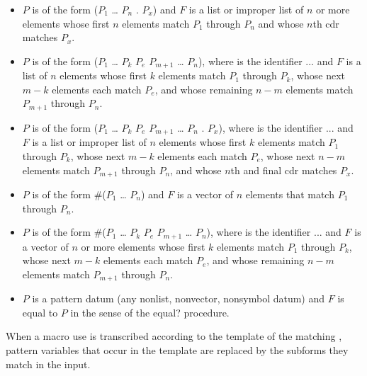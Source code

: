 \begin{entry}{%
}
\begin{itemize}
\item $P$ is of the form
{\cf ($P_1$ \dots{} $P_n$ . $P_x$)}
and $F$ is a list or improper list of $n$ or more elements
whose first $n$ elements match $P_1$ through $P_n$
and
whose $n$th cdr matches $P_x$.

\item $P$ is of the form
{\cf ($P_1$ \dots{} $P_k$ $P_e$  $P_{m+1}$ \dots{} $P_n$)},
where  is the identifier {\cf ...}
and $F$ is a list of $n$
elements whose first $k$ elements match $P_1$ through $P_k$,
whose next $m-k$ elements each match $P_e$,
and
whose remaining $n-m$ elements match $P_{m+1}$ through $P_n$.

\item $P$ is of the form
{\cf ($P_1$ \dots{} $P_k$ $P_e$  $P_{m+1}$ \dots{} $P_n$ . $P_x$)},
where  is the identifier {\cf ...}
and $F$ is a list or improper list of $n$
elements whose first $k$ elements match $P_1$ through $P_k$,
whose next $m-k$ elements each match $P_e$,
whose next $n-m$ elements match $P_{m+1}$ through $P_n$,
and 
whose $n$th and final cdr matches $P_x$.

\item $P$ is of the form
{\cf \#($P_1$ \dots{} $P_n$)}
and $F$ is a vector of $n$ elements that match $P_1$ through
$P_n$.

\item $P$ is of the form
{\cf \#($P_1$ \dots{} $P_k$ $P_e$  $P_{m+1}$ \dots{} $P_n$)},
where  is the identifier {\cf ...}
and $F$ is a vector of $n$ or more elements
whose first $k$ elements match $P_1$ through $P_k$,
whose next $m-k$ elements each match $P_e$,
and
whose remaining $n-m$ elements match $P_{m+1}$ through $P_n$.

\item $P$ is a pattern datum (any nonlist, nonvector, nonsymbol
datum) and $F$ is equal to $P$ in the sense of the
{\cf equal?} procedure.
\end{itemize}

When a macro use is transcribed according to the template of the
matching , pattern variables that occur in the
template are replaced by the subforms they match in the input.


\end{entry}
